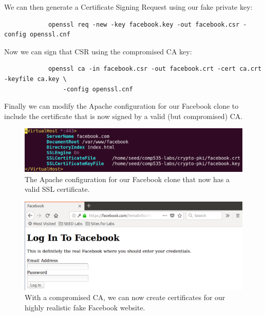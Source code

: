 \documentclass[12pt,letterpaper]{article}
\begin{document}
		We can then generate a Certificate Signing Request using our fake private key:
		
		\begin{verbatim}
			openssl req -new -key facebook.key -out facebook.csr -config openssl.cnf
		\end{verbatim}
		
		Now we can sign that CSR using the compromised CA key:
		
		\begin{verbatim}
			openssl ca -in facebook.csr -out facebook.crt -cert ca.crt -keyfile ca.key \
			    -config openssl.cnf
		\end{verbatim}
		
		Finally we can modify the Apache configuration for our Facebook clone to include the certificate that is now signed by a valid (but compromised) CA.
		
		\begin{figure}[h!]
			\includegraphics[width=\linewidth]{task-6-apache}
			\caption{The Apache configuration for our Facebook clone that now has a valid SSL certificate.}
		\end{figure}
	
		\begin{figure}[h!]
			\includegraphics[width=\linewidth]{task-6}
			\caption{With a compromised CA, we can now create certificates for our highly realistic fake Facebook website.}
		\end{figure}
		
\end{document}
